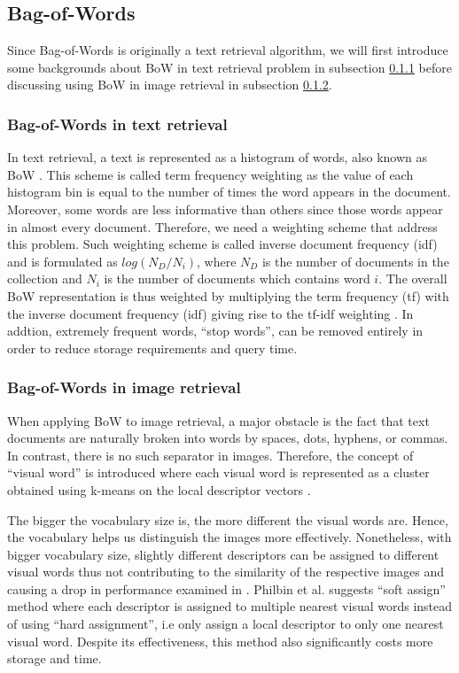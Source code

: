 \subsection{Bag-of-Words}\label{section:background_bow}

Since Bag-of-Words is originally a text retrieval algorithm, we will first introduce some backgrounds about BoW in text retrieval problem in subsection \ref{section:bow_text} before discussing using BoW in image retrieval in subsection \ref{section:bow_image}.

\subsubsection{Bag-of-Words in text retrieval}\label{section:bow_text}
In text retrieval, a text is represented as a histogram of words, also known as BoW \cite{4}. This scheme is called term frequency weighting as the value of each histogram bin is equal to the number of times the word appears in the document.
Moreover, some words are less informative than others since those words appear in almost every document. Therefore, we need a weighting scheme that address this problem. Such weighting scheme is called inverse document frequency (idf) and is formulated as $log(N_{D} / N_{i})$, where $N_{D}$ is the number of documents in the collection and $N_{i}$ is the number of documents which contains word $i$. The overall BoW representation is thus weighted by multiplying the term frequency (tf) with the inverse document frequency (idf) giving rise to the tf-idf weighting \cite{4}. In addtion, extremely frequent words, ``stop words'', can be removed entirely in order to reduce storage requirements and query time.


\subsubsection{Bag-of-Words in image retrieval} \label{section:bow_image}

When applying BoW to image retrieval, a major obstacle is the fact that text documents are naturally broken into words by spaces, dots, hyphens, or commas. In contrast, there is no such separator in images. Therefore, the concept of ``visual word'' is introduced where each visual word is represented as a cluster obtained using k-means on the local descriptor vectors \cite{3}.

The bigger the vocabulary size is, the more different the visual words are. Hence, the vocabulary helps us distinguish the images more effectively. Nonetheless, with bigger vocabulary size, slightly different descriptors can be assigned to different visual words thus not contributing to the similarity of the respective images and causing a drop in performance examined in \cite{5,6,7}. Philbin et al. \cite{7} suggests ``soft assign'' method where each descriptor is assigned to multiple nearest visual words instead of using ``hard assignment'', i.e only assign a local descriptor to only one nearest visual word. Despite its effectiveness, this method also significantly costs more storage and time.


